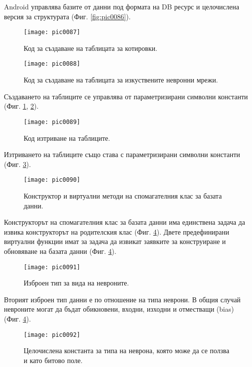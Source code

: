 Android управлява базите от данни под формата на DB ресурс и целочислена версия за структурата (Фиг. \ref{fig:pic0086}).

\begin{figure}[h]
  \centering
  \texttt{[image: pic0087]}
  \caption{Код за създаване на таблицата за котировки.}
\label{fig:pic0087}
\end{figure}
\FloatBarrier

\begin{figure}[h]
  \centering
  \texttt{[image: pic0088]}
  \caption{Код за създаване на таблицата за изкуствените невронни мрежи.}
\label{fig:pic0088}
\end{figure}
\FloatBarrier

Създаването на таблиците се управлява от параметризирани символни константи (Фиг. \ref{fig:pic0087}, \ref{fig:pic0088}).

\begin{figure}[h]
  \centering
  \texttt{[image: pic0089]}
  \caption{Код изтриване на таблиците.}
\label{fig:pic0089}
\end{figure}
\FloatBarrier

Изтриването на таблиците също става с параметризирани символни константи (Фиг. \ref{fig:pic0089}).

\begin{figure}[h]
  \centering
  \texttt{[image: pic0090]}
  \caption{Конструктор и виртуални методи на спомагателния клас за базата данни.}
\label{fig:pic0090}
\end{figure}
\FloatBarrier

Конструкторът на спомагателния клас за базата данни има единствена задача да извика конструкторът на родителския клас (Фиг. \ref{fig:pic0090}). Двете предефинирани виртуални функции имат за задача да извикат заявките за конструиране и обновяване на базата данни (Фиг. \ref{fig:pic0090}). 

\begin{figure}[h]
  \centering
  \texttt{[image: pic0091]}
  \caption{Изброен тип за вида на невроните.}
\label{fig:pic0091}
\end{figure}
\FloatBarrier

Вторият изброен тип данни е по отношение на типа неврони. В общия случай невроните могат да бъдат обикновени, входни, изходни и отместващи (bias) (Фиг. \ref{fig:pic0090}).

\begin{figure}[h]
  \centering
  \texttt{[image: pic0092]}
  \caption{Целочислена константа за типа на неврона, която може да се ползва и като битово поле.}
\label{fig:pic0092}
\end{figure}
\FloatBarrier

